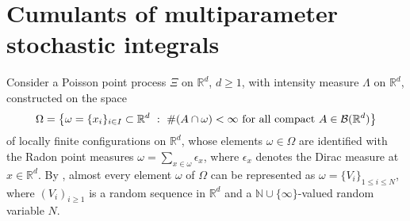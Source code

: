 \documentclass[12pt]{article}
\newcommand{\R}{\mathbb{R}}
\newcommand{\N}{\mathbb{N}}
\def\real{{\mathord{\mathbb R}}}
\def\N{{\mathord{\mathbb N}}}
\numberwithin{equation}{section}
\begin{document}
\section{Cumulants of multiparameter stochastic integrals} 
\label{s4}
\noindent 
 Consider a Poisson point process $\Xi$ on $\R^d$, $d \geq 1$, with intensity
measure $\Lambda$ on $\real^d$, %
 constructed on the space $$
 \Omega = \big\{
 \omega = \{ x_i \}_{i\in I} \subset \R^d \ : \
 \#( A \cap \omega ) < \infty 
 \mbox{ for all compact } A\in {\cal B} (\R^d) 
 \big\}
 $$
 of locally finite configurations on $\R^d$, whose elements 
 $\omega \in \Omega$ are identified with the Radon point measures 
 $\displaystyle \omega = \sum_{x\in \omega} \epsilon_x$, 
 where $\epsilon_x$ denotes the Dirac measure at $x\in \R^d$. 
 By \cite[Corollary~6.5]{LastPenrose17}, almost every
 element $ \omega$ of $\Omega$ 
 can be represented as $\omega =\{V_i\}_{1\leq i\leq N}$,
 where $(V_i)_{i\geq 1}$ is a random sequence 
 in $\R^d$ and a $\N\cup\{\infty\}$-valued random variable $N$.

 \medskip
\end{document}

